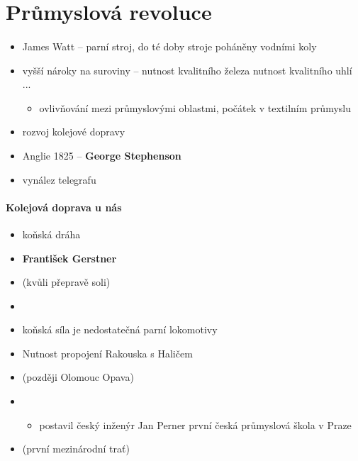 \section{Průmyslová revoluce}
\paragraph{}
\begin{itemize}
\item James Watt -- parní stroj, do té doby stroje poháněny vodními koly
\item vyšší nároky na suroviny -- nutnost kvalitního železa \ra nutnost kvalitního uhlí \ra ... 
	\begin{itemize}
	\item ovlivňování mezi průmyslovými oblastmi, počátek v textilním průmyslu
	\end{itemize}
\item rozvoj kolejové dopravy
\item Anglie 1825 -- \textbf{George Stephenson}
\item vynález telegrafu
\end{itemize}

\paragraph{Kolejová doprava u nás}
\begin{itemize}
\item koňská dráha
\item \textbf{František Gerstner}
\item {} (kvůli přepravě soli)
\item {}
\item koňská síla je nedostatečná \ra parní lokomotivy
\item Nutnost propojení Rakouska s Haličem
\item {} (později  \ra Olomouc \ra Opava)
\item {}
	\begin{itemize}
	\item postavil český inženýr Jan Perner \ra první česká průmyslová škola v Praze
	\end{itemize}
\item {} (první mezinárodní trať)
\end{itemize}


